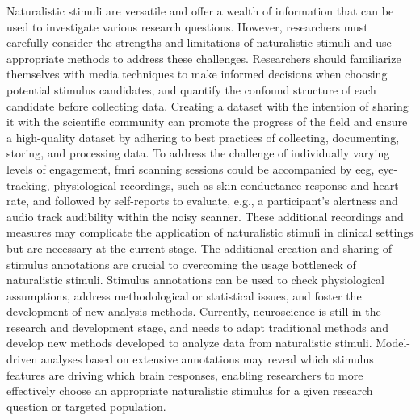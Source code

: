 %
Naturalistic stimuli are versatile and offer a wealth of information that can be
used to investigate various research questions.
%
However, researchers must carefully consider the strengths and limitations of
naturalistic stimuli and use appropriate methods to address these challenges.
%
Researchers should familiarize themselves with media techniques to make informed
decisions when choosing potential stimulus candidates, and quantify the confound
structure of each candidate before collecting data.
Creating a dataset with the intention of sharing it with the scientific
community can promote the progress of the field and ensure a high-quality
dataset by adhering to best practices of collecting, documenting, storing, and
processing data.
%
To address the challenge of individually varying levels of engagement, \ac{fmri}
scanning sessions could be accompanied by \ac{eeg}, eye-tracking, physiological
recordings, such as skin conductance response and heart rate, and followed by
self-reports to evaluate, e.g., a participant's alertness and audio track
audibility within the noisy scanner.
%
These additional recordings and measures may complicate the application of
naturalistic stimuli in clinical settings but are necessary at the current
stage.
The additional creation and sharing of stimulus annotations are crucial to
overcoming the usage bottleneck of naturalistic stimuli.
%
Stimulus annotations can be used to check physiological assumptions, address
methodological or statistical issues, and foster the development of new analysis
methods.
%
Currently, neuroscience is still in the research and development stage, and
needs to adapt traditional methods and develop new methods developed to analyze
data from naturalistic stimuli.
%
Model-driven analyses based on extensive annotations may reveal which stimulus
features are driving which brain responses, enabling researchers to more
effectively choose an appropriate naturalistic stimulus for a given research
question or targeted population.

